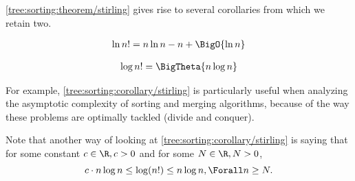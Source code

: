 \ref{tree:sorting:theorem/stirling} gives rise to several corollaries from
which we retain two.
\begin{corollary}
\begin{align*}
\ln n! &= n \ln n - n + \BigO{\ln n}\\
\end{align*}
\end{corollary}
\begin{corollary}
\label{tree:sorting:corollary/stirling}
\begin{align*}
\log n! &= \BigTheta{n \log n}\\
\end{align*}
\end{corollary}
For example, \ref{tree:sorting:corollary/stirling} is particularly useful
when analyzing the asymptotic complexity of sorting and merging algorithms, because
of the way these problems are optimally tackled (divide and conquer).

Note that another way of looking at \ref{tree:sorting:corollary/stirling} is
saying that for some constant $c \in \R, c > 0$ and for some $N \in \R, N > 0$,
\begin{displaymath}
c \cdot n \log n \leq \log(n!) \leq n \log n, \Forall n \geq N.
\end{displaymath}

